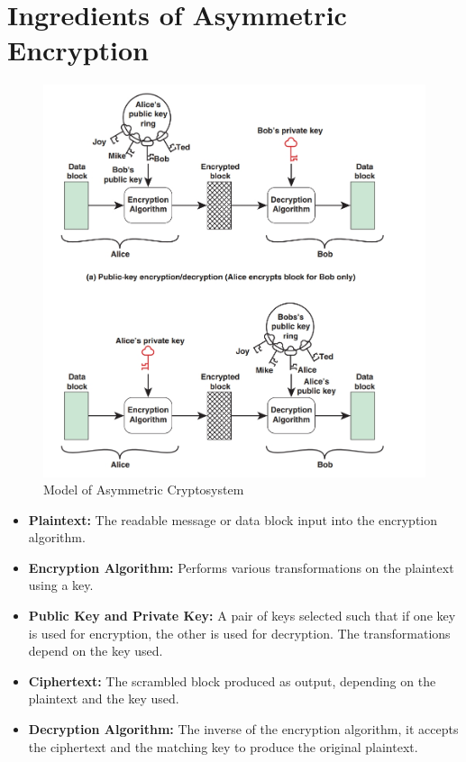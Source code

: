 \section{Ingredients of Asymmetric Encryption}
\begin{figure}
    \centering
    \includegraphics[width=1\linewidth]{Data_Privacy_and_Cryptography/Figures/model of asymmetric crypto.jpeg}
    \caption{Model of Asymmetric Cryptosystem}
    \label{fig:enter-label}
\end{figure}
\begin{itemize}
    \item \textbf{Plaintext:} The readable message or data block input into the encryption algorithm.
    \item \textbf{Encryption Algorithm:} Performs various transformations on the plaintext using a key.
    \item \textbf{Public Key and Private Key:} A pair of keys selected such that if one key is used for encryption, the other is used for decryption. The transformations depend on the key used.
    \item \textbf{Ciphertext:} The scrambled block produced as output, depending on the plaintext and the key used.
    \item \textbf{Decryption Algorithm:} The inverse of the encryption algorithm, it accepts the ciphertext and the matching key to produce the original plaintext.
\end{itemize}

